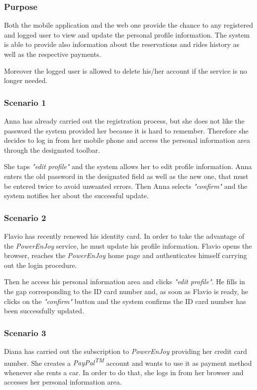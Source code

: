 \subsubsection{Purpose}
Both the mobile application and the web one provide the chance to any registered and logged user to view and update the personal profile information. The system is able to provide also information about the reservations and rides history as well as the respective payments.

Moreover the logged user is allowed to delete his/her account if the service is no longer needed.

\subsubsection{Scenario 1}
Anna has already carried out the registration process, but she does not like the password the system provided her because it is hard to remember. Therefore she decides to log in from her mobile phone and access the personal information area through the designated toolbar.

She taps \emph{"edit profile"} and the system allows her to edit profile information. Anna enters the old password in the designated field as well as the new one, that must be entered twice to avoid unwanted errors. Then Anna selects \emph{"confirm"} and the system notifies her about the successful update.

\subsubsection{Scenario 2}
Flavio has recently renewed his identity card. In order to take the advantage of the \emph{PowerEnJoy} service, he must update his profile information. Flavio opens the browser, reaches the \emph{PowerEnJoy} home page and authenticates himself carrying out the login procedure. 

Then he access his personal information area and clicks \emph{"edit profile"}. He fills in the gap corresponding to the ID card number and, as soon as Flavio is ready, he clicks on the \emph{"confirm"} button and the system confirms the ID card number has been successfully updated.

\subsubsection{Scenario 3}
Diana has carried out the subscription to \emph{PowerEnJoy} providing her credit card number. She creates a \emph{PayPal\textsuperscript{TM}} account and wants to use it as payment method whenever she rents a car. In order to do that, she logs in from her browser and accesses her personal information area.


